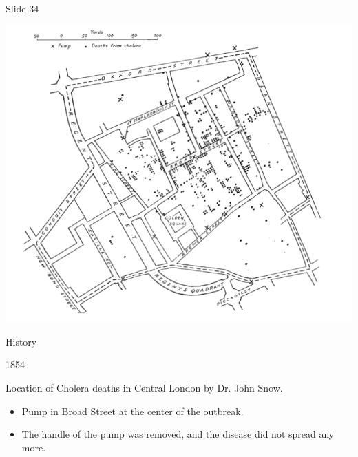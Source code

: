 \documentclass[
  ignorenonframetext,
]{beamer}
\begin{document}
\begin{frame}{Slide 34}
\protect\hypertarget{slide-34}{}
\begin{minipage}{0.45\textwidth}
\centering
\includegraphics[width=\textwidth]{excellence_figs/fig_29.png}
\end{minipage}
\hfill
\begin{minipage}{0.5\textwidth}
\footnotesize
History

1854

Location of Cholera deaths in Central London by Dr. John Snow.

\begin{itemize}
  \item Pump in Broad Street at the center of the outbreak.
  \item The handle of the pump was removed, and the disease did not spread any more.
\end{itemize}
\end{minipage}
\end{frame}
\end{document}
